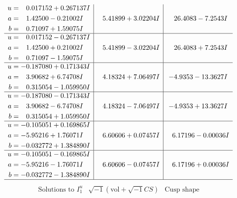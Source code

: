\documentclass[1p]{elsarticle_modified}
\theoremstyle{definition}
\newcommand{\I}{\sqrt{-1}}
\begin{document}
$$\begin{array}{c|c|c}
\begin{aligned}
u &= \phantom{-}0.017152 + 0.267137 I \\
a &= \phantom{-}1.42500 - 0.21002 I \\
b &= \phantom{-}0.71097 + 1.59075 I\end{aligned}
 & \phantom{-}5.41899 + 3.02204 I & \phantom{-}26.4083 - 7.2543 I \\ \hline\begin{aligned}
u &= \phantom{-}0.017152 - 0.267137 I \\
a &= \phantom{-}1.42500 + 0.21002 I \\
b &= \phantom{-}0.71097 - 1.59075 I\end{aligned}
 & \phantom{-}5.41899 - 3.02204 I & \phantom{-}26.4083 + 7.2543 I \\ \hline\begin{aligned}
u &= -0.187080 + 0.171343 I \\
a &= \phantom{-}3.90682 + 6.74708 I \\
b &= \phantom{-}0.315054 - 1.059950 I\end{aligned}
 & \phantom{-}4.18324 + 7.06497 I & -4.9353 - 13.3627 I \\ \hline\begin{aligned}
u &= -0.187080 - 0.171343 I \\
a &= \phantom{-}3.90682 - 6.74708 I \\
b &= \phantom{-}0.315054 + 1.059950 I\end{aligned}
 & \phantom{-}4.18324 - 7.06497 I & -4.9353 + 13.3627 I \\ \hline\begin{aligned}
u &= -0.105051 + 0.169865 I \\
a &= -5.95216 + 1.76071 I \\
b &= -0.032772 + 1.384890 I\end{aligned}
 & \phantom{-}6.60606 + 0.07457 I & \phantom{-}6.17196 - 0.00036 I \\ \hline\begin{aligned}
u &= -0.105051 - 0.169865 I \\
a &= -5.95216 - 1.76071 I \\
b &= -0.032772 - 1.384890 I\end{aligned}
 & \phantom{-}6.60606 - 0.07457 I & \phantom{-}6.17196 + 0.00036 I\\
 \hline 
 \end{array}$$\newpage$$\begin{array}{c|c|c}  
\text{Solutions to }I^u_{1}& \I (\text{vol} + \sqrt{-1}CS) & \text{Cusp shape}\\

\end{array}$$
\end{document}
